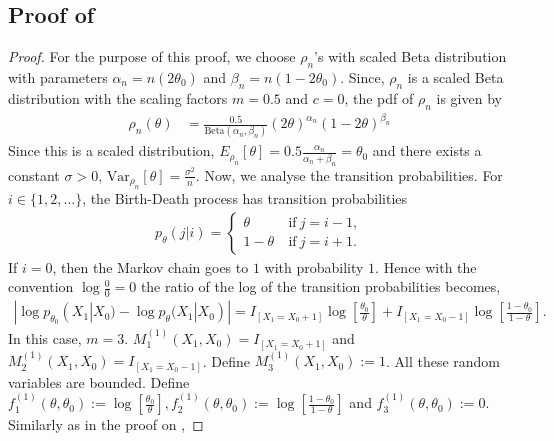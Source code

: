 \documentclass[11pt]{amsart}
\newcommand{\Var}{\mathrm{Var}}
\begin{document}
%
%
%
%
%

\subsection{Proof of }

\begin{proof}
For the purpose of this proof, we choose $\rho_n$'s with scaled Beta distribution with parameters $\alpha_n=n(2\theta_0)$ and $\beta_n=n(1-2\theta_0)$. Since, $\rho_n$ is a scaled Beta distribution with the scaling factors $m=0.5$ and $c=0$, the pdf of $\rho_n$ is given by
\begin{align*}
    \rho_n(\theta) & = \frac{0.5}{\text{Beta}(\alpha_n,\beta_n)}\left(2\theta\right)^{\alpha_n}\left(1-2\theta\right)^{\beta_n}
\end{align*} 
Since this is a scaled distribution, $E_{\rho_n}[\theta]=0.5\frac{\alpha_n}{\alpha_n+\beta_n}=\theta_0$ and there exists a constant $\sigma>0$, $\Var_{\rho_n}[\theta]=\frac{\sigma^2}{n}$. Now, we analyse the transition probabilities.
For $i \in \{1,2,\dots\}$, the Birth-Death process has transition probabilities
\begin{align*}
    p_{\theta}(j|i) = \begin{cases}
    \theta &~\text{if}~j=i-1,\\
    1-\theta&~\text{if}~j=i+1.
    \end{cases}
\end{align*}
If $i=0$, then the Markov chain goes to $1$ with probability $1$. Hence with the convention $\log\frac{0}{0}=0$ the ratio of the log of the transition probabilities becomes,
\begin{align*}
    | \log p_{\theta_0}(X_1|X_0)-\log p_{\theta}(X_1|X_0) | = I_{[X_1=X_0+1]}\log\left[\frac{\theta_0}{\theta}\right]+I_{[X_1=X_0-1]}\log\left[\frac{1-\theta_0}{1-\theta}\right].
\end{align*}
In this case, $m=3$. $M^{(1)}_1(X_1,X_0)=I_{[X_1=X_0+1]}$ and $M^{(1)}_2(X_1,X_0)=I_{[X_1=X_0-1]}$. Define $M^{(1)}_3(X_1,X_0) := 1$. All these random variables are bounded. Define $f^{(1)}_1(\theta,\theta_0) := \log\left[\frac{\theta_0}{\theta}\right], f^{(1)}_2(\theta,\theta_0) :=\log\left[\frac{1-\theta_0}{1-\theta}\right]$ and $f^{(1)}_3(\theta,\theta_0):=0$. Similarly as in the proof on , 

\end{proof}
\end{document}

